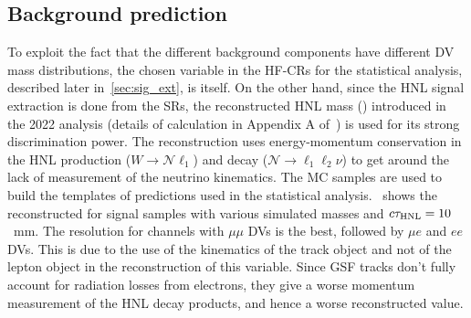 \subsection{Background prediction}
To exploit the fact that the different background components have different DV mass distributions, the chosen variable  in the HF-CRs for the statistical analysis, described later in~\cref{sec:sig_ext}, is \mdv itself. On the other hand, since the HNL signal extraction is done from the SRs, the reconstructed HNL mass (\mhnl) introduced in the 2022 analysis (details of calculation in Appendix A of~\cite{PhysRevLett.131.061803}) is used for its strong discrimination power. The reconstruction uses energy-momentum conservation in the HNL production ($W\to\mathcal{N}\ell_1$) and decay ($\mathcal{N}\to\ell_1\ell_2\nu$) to get around the lack of measurement of the neutrino kinematics. The MC samples are used to build the templates of predictions used in the statistical analysis.~ shows the reconstructed \mhnl for signal samples with various simulated masses and $c\tau_\mathrm{HNL} = 10$~mm. The \mhnl resolution for channels with $\mu\mu$ DVs is the best, followed by $\mu e$ and $ee$ DVs. This is due to the use of the kinematics of the track object and not of the lepton object in the reconstruction of this variable. Since GSF tracks don't fully account for radiation losses from electrons, they give a worse momentum measurement of the HNL decay products, and hence a worse reconstructed \mhnl value.

